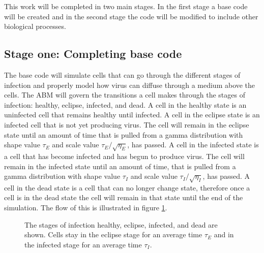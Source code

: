 \documentclass[a4paper]{article}
\begin{document}
%
This work will be completed in two main stages. In the first stage a base code will be created and in the second stage the code will be modified to include other biological processes.

\subsection{Stage one: Completing base code}
The base code will simulate cells that can go through the different stages of infection and properly model how virus can diffuse through a medium above the cells. The ABM will govern the transitions a cell makes through the stages of infection: healthy, eclipse, infected, and dead. A cell in the healthy state is an uninfected cell that remains healthy until infected. A cell in the eclipse state is an infected cell that is not yet producing virus. The cell will remain in the eclipse state until an amount of time that is pulled from a gamma distribution  with shape value $\tau_E$ and scale value $\tau_E/\sqrt{\eta_E}$, has passed. A cell in the infected state is a cell that has become infected and has begun to produce virus. The cell will remain in the infected state until an amount of time, that is pulled from a gamma distribution with shape value $\tau_I$ and scale value $\tau_I/\sqrt{\eta_I}$, has passed. A cell in the dead state is a cell that can no longer change state, therefore once a cell is in the dead state the cell will remain in that state until the end of the simulation. The flow of this is illustrated in figure \ref{fig:stages_of_infection}. 

\begin{figure}[h]
    \centering
    \caption{The stages of infection healthy, eclipse, infected, and dead are shown. Cells stay in  the eclipse stage for an average time $\tau_E$ and in the infected stage for an average time $\tau_I$.}
    \label{fig:stages_of_infection}
\end{figure}
\end{document}
